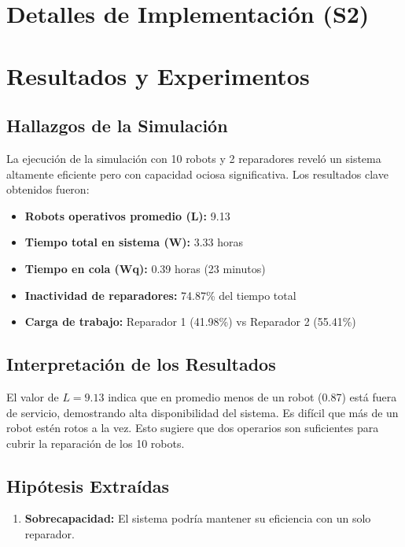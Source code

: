 \documentclass[12pt, a4paper]{article}
\begin{document}
\section{Detalles de Implementación (S2)}

\section{Resultados y Experimentos}
\label{sec:resultados}

\subsection{Hallazgos de la Simulación}
La ejecución de la simulación con 10 robots y 2 reparadores reveló un sistema altamente eficiente pero con capacidad ociosa significativa. Los resultados clave obtenidos fueron:
\begin{itemize}
    \item \textbf{Robots operativos promedio (L):} 9.13
    \item \textbf{Tiempo total en sistema (W):} 3.33 horas
    \item \textbf{Tiempo en cola (Wq):} 0.39 horas (23 minutos)
    \item \textbf{Inactividad de reparadores:} 74.87\% del tiempo total
    \item \textbf{Carga de trabajo:} Reparador 1 (41.98\%) vs Reparador 2 (55.41\%)
\end{itemize}

\subsection{Interpretación de los Resultados}
El valor de $L = 9.13$ indica que en promedio menos de un robot (0.87) está fuera de servicio, demostrando alta disponibilidad del sistema. Es difícil que más de un robot estén rotos a la vez. Esto sugiere que dos operarios son suficientes para cubrir la reparación de los 10 robots.

\subsection{Hipótesis Extraídas}
\begin{enumerate}
    \item \textbf{Sobrecapacidad:} El sistema podría mantener su eficiencia con un solo reparador.
\end{enumerate}
\end{document}
